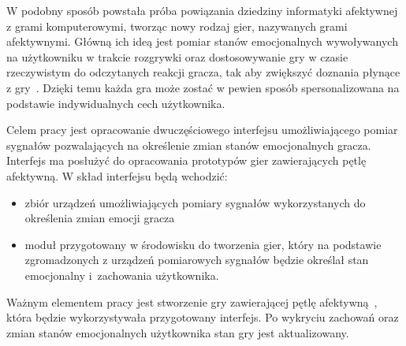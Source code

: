 W podobny sposób powstała próba powiązania dziedziny informatyki afektywnej z grami komputerowymi, tworząc nowy rodzaj gier, nazywanych grami afektywnymi. Główną ich ideą jest pomiar stanów emocjonalnych wywoływanych na użytkowniku w trakcie rozgrywki oraz dostosowywanie gry w czasie rzeczywistym do odczytanych reakcji gracza, tak aby zwiększyć doznania płynące z gry~\cite{kotsia_affective_gaming}. Dzięki temu każda gra może zostać w pewien sposób spersonalizowana na podstawie indywidualnych cech użytkownika. 

Celem pracy jest opracowanie dwuczęściowego interfejsu umożliwiającego pomiar sygnałów pozwalających na określenie zmian stanów emocjonalnych gracza. Interfejs ma posłużyć do opracowania prototypów gier zawierających pętlę afektywną. W skład interfejsu będą wchodzić:
\begin{itemize}
	\item zbiór urządzeń umożliwiających pomiary sygnałów wykorzystanych do określenia zmian emocji gracza
	\item moduł przygotowany w środowisku do tworzenia gier, który na podstawie zgromadzonych z urządzeń pomiarowych sygnałów będzie określał stan emocjonalny i~zachowania użytkownika.
\end{itemize}
Ważnym elementem pracy jest stworzenie gry zawierającej pętlę afektywną~\cite{affective_loop_experiences}, która będzie wykorzystywała przygotowany interfejs. Po wykryciu zachowań oraz zmian stanów emocjonalnych użytkownika stan gry jest aktualizowany.

